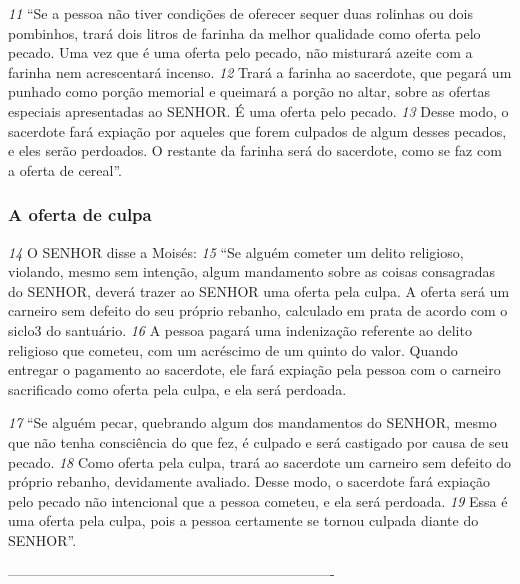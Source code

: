 \smallskip
\textit{\tiny 11}
“Se a pessoa não tiver condições de oferecer sequer duas rolinhas ou dois
pombinhos, trará dois litros de farinha da melhor qualidade como oferta pelo
pecado. Uma vez que é uma oferta pelo pecado, não misturará azeite com a
farinha nem acrescentará incenso. 
\textit{\tiny 12}
Trará a farinha ao sacerdote, que pegará um
punhado como porção memorial e queimará a porção no altar, sobre as ofertas
especiais apresentadas ao SENHOR. É uma oferta pelo pecado. 
\textit{\tiny 13}
Desse modo, o
sacerdote fará expiação por aqueles que forem culpados de algum desses
pecados, e eles serão perdoados. O restante da farinha será do sacerdote, como se
faz com a oferta de cereal”.

\bigskip
\subsubsection*{A oferta de culpa}
\textit{\tiny 14}
O SENHOR disse a Moisés: 
\textit{\tiny 15}
“Se alguém cometer um delito religioso, violando,
mesmo sem intenção, algum mandamento sobre as coisas consagradas do SENHOR,
deverá trazer ao SENHOR uma oferta pela culpa. A oferta será um carneiro sem
defeito do seu próprio rebanho, calculado em prata de acordo com o siclo3 do
santuário. 
\textit{\tiny 16}
A pessoa pagará uma indenização referente ao delito religioso que
cometeu, com um acréscimo de um quinto do valor. Quando entregar o
pagamento ao sacerdote, ele fará expiação pela pessoa com o carneiro sacrificado
como oferta pela culpa, e ela será perdoada.
  
\smallskip
\textit{\tiny 17}
“Se alguém pecar, quebrando algum dos mandamentos do SENHOR, mesmo
que não tenha consciência do que fez, é culpado e será castigado por causa de seu
pecado. 
\textit{\tiny 18}
Como oferta pela culpa, trará ao sacerdote um carneiro sem defeito do
próprio rebanho, devidamente avaliado. Desse modo, o sacerdote fará expiação
pelo pecado não intencional que a pessoa cometeu, e ela será perdoada. 
\textit{\tiny 19}
Essa é
uma oferta pela culpa, pois a pessoa certamente se tornou culpada diante do
SENHOR”.

----------------------------------------------------------------------
